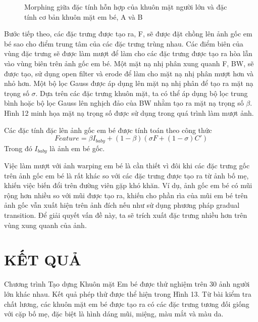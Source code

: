 \documentclass[journal]{IEEEtran}
\begin{document}
\begin{figure}[!t]
\label{refhinh4}
\caption{Morphing giữa đặc tính hỗn hợp của khuôn mặt người lớn và đặc tính cơ bản khuôn mặt em bé, A và B}
\end{figure}
Bước tiếp theo, các đặc trưng được tạo ra, F, sẽ được đặt chồng lên ảnh gốc em bé sao cho điểm trung tâm của các đặc trưng trùng nhau. Các điểm biên của vùng đặc trưng sẽ được làm mượt để làm cho các đặc trưng được tạo ra hòa lẫn vào vùng biên trên ảnh gốc em bé. Một mặt nạ nhị phân xung quanh F, BW, sẽ được tạo, sử dụng open filter và erode để làm cho mặt nạ nhị phân mượt hơn và nhỏ hơn. Một bộ lọc Gauss được áp dụng lên mặt nạ nhị phân để tạo ra mặt nạ trọng số $\sigma$. Dựa trên các đặc trưng khuôn mặt, ta có thể áp dụng bộ lọc trung bình hoặc bộ lọc Gauss lên nghịch đảo của BW nhằm tạo ra mặt nạ trọng số $\beta$. Hình 12 minh họa mặt nạ trọng số được sử dụng trong quá trình làm mượt ảnh.  

Các đặc tính đặc lên ảnh gốc em bé được tính toán theo công thức \[Feature = \beta I_{baby}+(1 - \beta )(\sigma F+(1-\sigma )C')\]
Trong đó $I_{baby}$ là ảnh em bé gốc.

Việc làm mượt với ảnh warping em bé là cần thiết vì đôi khi các đặc trưng gốc trên ảnh gốc em bé là rất khác so với các đặc trưng được tạo ra từ ảnh bố mẹ, khiến việc biến đổi trên đường viên gặp khó khăn. Ví dụ, ảnh gốc em bé có mũi rộng hơn nhiều so với mũi được tạo ra, khiến cho phần rìa của mũi em bé trên ảnh gốc vẫn xuất hiện trên ảnh đích nếu như sử dụng phương pháp gradual transition. Để giải quyết vấn đề này, ta sẽ trích xuất đặc trưng nhiều hơn trên vùng xung quanh của ảnh.

\section{KẾT QUẢ}
Chương trình Tạo dựng Khuôn mặt Em bé được thử nghiệm trên 30 ảnh người lớn khác nhau. Kết quả phép thử được thể hiện trong Hình 13. Từ bài kiểm tra chất lương, các khuôn mặt em bé được tạo ra có các đặc trưng tương đối giống với cặp bố mẹ, đặc biệt là hình dáng mũi, miệng, màu mắt và màu da.
\end{document}
